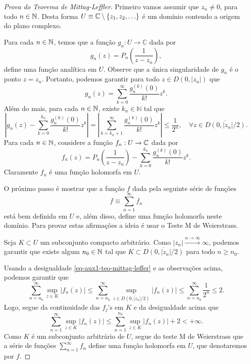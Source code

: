     
    
    
    \begin{proof}[Prova do Teorema de Mittag-Leffler]
    Primeiro vamos assumir que $z_n\neq 0$, para todo $n\in\mathbb{N}$.
    Desta forma 
    $U\equiv \mathbb{C}\setminus\{z_1,z_2,\ldots\}$ 
    é um domínio contendo a origem do plano complexo.
    
    
    Para cada $n\in\mathbb{N}$, temos que a função $g_n:U\to\mathbb{C}$
    dada por
    \[
    g_n(z) = P_n\left(\frac{1}{z-z_n}\right),
    \]
    define uma função analítica em $U$. 
    Observe que a única singularidade de 
    $g_n$ é o ponto $z=z_n$. 
    Portanto, podemos garantir para todo $z\in D(0,|z_n|)$ que
    \[
    g_n(z) = \sum_{k=0}^{\infty} \frac{g_{n}^{(k)}(0)}{k!}z^k. 
    \]
    Além do mais, para cada $n\in\mathbb{N}$, existe $k_n\in\mathbb{N}$ tal que
    \begin{equation}
    \label{eq-aux1-teo-mittag-leffer}
    \left| 
    g_n(z) - \sum_{k=0}^{k_n} \frac{g_{n}^{(k)}(0)}{k!}z^k
    \right|
    =
    \left| 
    \sum_{k=k_n+1}^{\infty} \frac{g_{n}^{(k)}(0)}{k!}z^k
    \right|
    \leq 
    \frac{1}{2^n},\quad \forall z\in \overline{D(0,|z_n|/2)}.
    \end{equation}    
    Para cada $n\in\mathbb{N}$, considere a função $f_n:U\to\mathbb{C}$ dada por
    \[
    f_n(z) = P_n\left(\frac{1}{z-z_n}\right)- \sum_{k=0}^{k_n} \frac{g_{n}^{(k)}(0)}{k!}z^k.
    \]
    Claramente $f_n$ é uma função holomorfa em $U$. 
    
    O próximo passo é mostrar que a função $f$ dada
    pela seguinte série de funções 
    \[
    f\equiv \sum_{n=1}^{\infty} f_n
    \]
    está bem definida em $U$ e, além disso, define uma
    função holomorfa neste domínio. 
    Para provar estas afirmações a ideia é 
    usar o Teste M de Weierstrass. 
    
    Seja $K\subset U$ um subconjunto compacto arbitrário. 
    Como $|z_n|\xrightarrow{n\to\infty}\infty$, podemos 
    garantir que existe algum 
    $n_0\in\mathbb{N}$ tal que $K\subset \overline{D(0,|z_n|/2)}$ 
    para todo $n\geqslant n_0$. 
    
    Usando a desigualdade \eqref{eq-aux1-teo-mittag-leffer}
    e as observações acima, podemos garantir que
    \[
    \sum_{n=n_0}^{\infty} \sup_{z\in K}|f_n(z)|
    \leqslant 
    \sum_{n=n_0}^{\infty} \sup_{z\in \overline{D(0,|z_n|/2)}} |f_n(z)|
    \leqslant 
    \sum_{n=n_0}^{\infty} \frac{1}{2^n}
    \leqslant
    2.
    \]
    Logo, segue da continuidade das $f_j$'s em $K$ 
    e da desigualdade acima que
    \[
    \sum_{n=1}^{\infty} \sup_{z\in K} |f_n(z)|
    \leqslant
    \sum_{n=1}^{n_0} \sup_{z\in K} |f_n(z)|
    +2
    <+\infty.
    \]
    Como $K$ é um subconjunto arbitrário de $U$, segue do teste
    M de Weierstrass que a série de funções 
    $\sum_{n=1}^{\infty}f_n$ define uma função holomorfa em $U$,
    que denotaremos por $f$. 
    

\end{proof}
